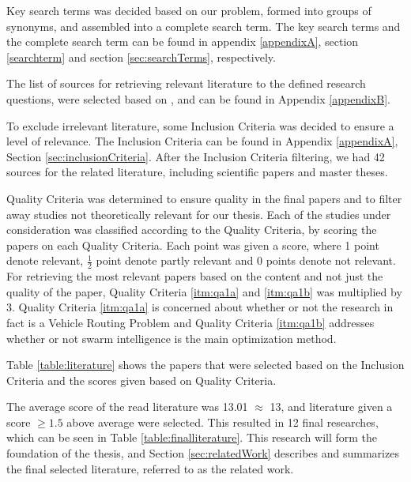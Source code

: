 Key search terms was decided based on our problem, formed into groups of synonyms, and assembled into a complete search term. The key search terms and the complete search term can be found in appendix \ref{appendixA}, section \vref{searchterm} and section \vref{sec:searchTerms}, respectively.


The list of sources for retrieving relevant literature to the defined research questions, were selected based on \citep[p.3]{kofod2014}, and can be found in Appendix \vref{appendixB}. 

To exclude irrelevant literature, some Inclusion Criteria was decided to ensure a level of relevance. The Inclusion Criteria can be found in Appendix \ref{appendixA}, Section \ref{sec:inclusionCriteria}. After the Inclusion Criteria filtering, we had 42 sources for the related literature, including scientific papers and master theses. 

Quality Criteria was determined to ensure quality in the final papers and to filter away studies not theoretically relevant for our thesis. Each of the studies under consideration was classified according to the Quality Criteria, by scoring the papers on each Quality Criteria. Each point was given a score, where 1 point denote relevant, $\frac{1}{2}$ point denote partly relevant and 0 points denote not relevant. For retrieving the most relevant papers based on the content and not just the quality of the paper, Quality Criteria \ref{itm:qa1a} and \vref{itm:qa1b} was multiplied by 3. Quality Criteria \ref{itm:qa1a} is concerned about whether or not the research in fact is a Vehicle Routing Problem and Quality Criteria \ref{itm:qa1b} addresses whether or not swarm intelligence is the main optimization method. 

Table \vref{table:literature} shows the papers that were selected based on the Inclusion Criteria and the scores given based on Quality Criteria.

The average score of the read literature was 13.01 $\approx$ 13, and literature given a score $\geq{1.5}$ above average were selected. This resulted in 12 final researches, which can be seen in Table \vref{table:finalliterature}. This research will form the foundation of the thesis, and Section \vref{sec:relatedWork} describes and summarizes the final selected literature, referred to as the related work. 
